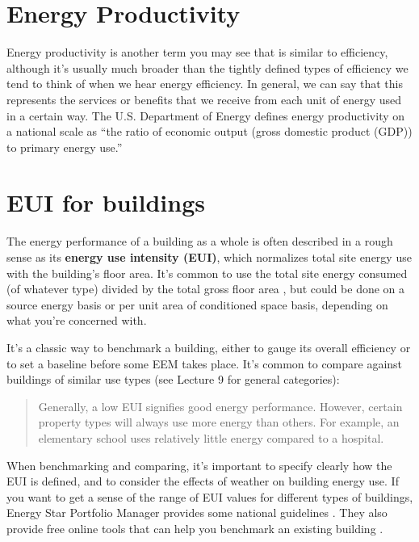 \documentclass[10pt]{article}
\begin{document}
\section{Energy Productivity}

Energy productivity is another term you may see that is similar to efficiency, although it's usually much broader than the tightly defined types of efficiency we tend to think of when we hear energy efficiency. In general, we can say that this represents the services or benefits that we receive from each unit of energy used in a certain way. The U.S. Department of Energy defines energy productivity on a national scale as ``the ratio of economic output (gross
domestic product (GDP)) to primary energy use.'' \cite{energyproductivity}


\section{EUI for buildings}

The energy performance of a building as a whole is often described in a rough sense as its \textbf{energy use intensity (EUI)}, which normalizes total site energy use with the building's floor area. It's common to use the total site energy consumed (of whatever type) divided by the total gross floor area \cite{noauthor_undated-vw}, but could be done on a source energy basis \cite{noauthor_undated-kb} or per unit area of conditioned space basis, depending on what you're concerned with.

It's a classic way to benchmark a building, either to gauge its overall efficiency or to set a baseline before some EEM takes place. It's common to compare against buildings of similar use types (see Lecture 9 for general categories):

\begin{quote}
    Generally, a low EUI signifies good energy performance. However, certain property types will always use more energy than others. For example, an elementary school uses relatively little energy compared to a hospital. \cite{noauthor_undated-vw}
\end{quote}

When benchmarking and comparing, it's important to specify clearly how the EUI is defined, and to consider the effects of weather on building energy use. If you want to get a sense of the range of EUI values for different types of buildings, Energy Star Portfolio Manager provides some national guidelines \cite{Breakdown_undated-ho}. They also provide free online tools that can help you benchmark an existing building \cite{noauthor_undated-aw}.
\end{document}
